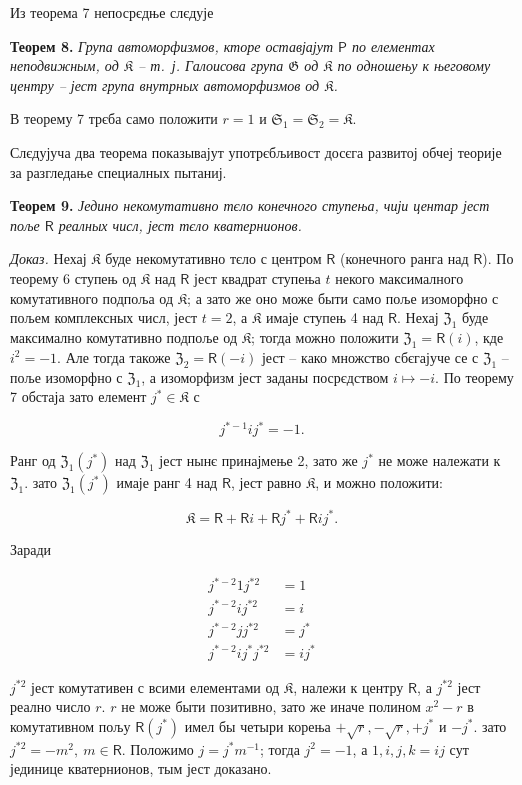 \documentclass[11pt]{article}
\begin{document}
Из теорема 7 непосрєдње слєдује

\textbf{Теорем 8.} \emph{Група автоморфизмов, кторе оставјајут \(\mathsf P\) по елементах неподвижным, од \(\mathfrak K\) -- т.~ј. Галоисова група \(\mathfrak G\) од \(\mathfrak K\) по одношењу к његовому центру -- јест група внутрных автоморфизмов од \(\mathfrak K\).}

В теорему 7 трєба само положити \(r=1\) и \(\mathfrak S_1=\mathfrak S_2=\mathfrak K\).

Слєдујуча два теорема показывајут употрєбљивост досєга развитој обчеј теорије за разгледање специалных пытаниј.

\textbf{Теорем 9.} \emph{Једино некомутативно тєло конечного ступења, чији центар јест поље \(\mathsf{R}\) реалных числ, јест тєло кватернионов.}

\emph{Доказ.} Нехај \(\mathfrak K\) буде некомутативно тєло с центром \(\mathsf{R}\) (конечного ранга над \(\mathsf{R}\)). По теорему 6 ступењ од \(\mathfrak K\) над \(\mathsf{R}\) јест квадрат ступења \(t\) некого максималного комутативного подпоља од \(\mathfrak K\); а зато же оно може быти само поље изоморфно с пољем комплексных числ, јест \(t=2\), а \(\mathfrak K\) имаје ступењ 4 над \(\mathsf{R}\). Нехај \(\mathfrak Z_1\) буде максимално комутативно подпоље од \(\mathfrak K\); тогда можно положити \(\mathfrak Z_1=\mathsf{R}(i)\), кде \(i^2=-1\). Але тогда такоже \(\mathfrak Z_2=\mathsf{R}(-i)\) јест -- како множство сбєгајуче се с \(\mathfrak Z_1\) -- поље изоморфно с \(\mathfrak Z_1\), а изоморфизм јест заданы посрєдством \(i\mapsto -i\). По теорему 7 обстаја зато елемент \(j^*\in\mathfrak K\) с

\[
j^{*-1}ij^*=-1.
\]

Ранг од \(\mathfrak Z_1(j^*)\) над \(\mathfrak Z_1\) јест нынє принајмење 2, зато же \(j^*\) не може належати к \(\mathfrak Z_1\). зато \(\mathfrak Z_1(j^*)\) имаје ранг 4 над \(\mathsf{R}\), јест равно \(\mathfrak K\), и можно положити:

\[
\mathfrak K=\mathsf R+\mathsf Ri+\mathsf Rj^*+\mathsf Rij^*.
\]

Заради

\[
\begin{aligned}
j^{*-2}1j^{*2}&=1\\
j^{*-2}ij^{*2}&=i\\
j^{*-2}jj^{*2}&=j^*\\
j^{*-2}ij^*j^{*2}&=ij^*
\end{aligned}
\]

\(j^{*2}\) јест комутативен с всими елементами од \(\mathfrak K\), належи к центру \(\mathsf{R}\), а \(j^{*2}\) јест реално число \(r\). \(r\) не може быти позитивно, зато же иначе полином \(x^2-r\) в комутативном пољу \(\mathsf{R}(j^*)\) имел бы четыри корења \(+\sqrt r,-\sqrt r,+j^*\) и \(-j^*\). зато \(j^{*2}=-m^2,\ m\in \mathsf{R}\). Положимо \(j=j^*m^{-1}\); тогда \(j^2=-1\), а \(1,i,j,k=ij\) сут јединице кватернионов, тым јест доказано.
\end{document}

